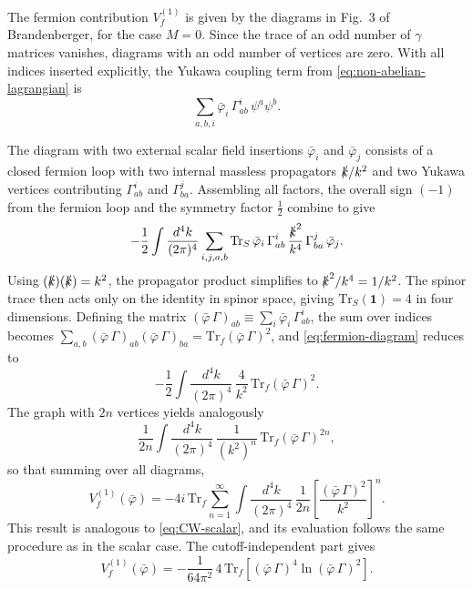 The fermion contribution $V_f^{(1)}$ is given by the diagrams in Fig.~3
of Brandenberger, for the case $M=0$. Since the trace of an odd number
of $\gamma$ matrices vanishes, diagrams with an odd number of vertices
are zero. With all indices inserted explicitly, the Yukawa coupling term
from \eqref{eq:non-abelian-lagrangian} is
\begin{equation}
    \sum_{a,b,i}\bar\varphi_i\,\Gamma^i_{ab}\,\psi^a\psi^b.
    \label{eq:yukawa}
\end{equation}


The diagram with two external scalar field insertions $\bar\varphi_i$
and $\bar\varphi_j$ consists of a closed fermion loop with two internal
massless propagators $\slashed{k}/k^2$ and two Yukawa vertices
contributing $\Gamma^i_{ab}$ and $\Gamma^j_{ba}$. Assembling all
factors, the overall sign $(-1)$ from the fermion loop and the symmetry
factor $\frac{1}{2}$ combine to give
\begin{equation}
    -\frac{1}{2}\int\frac{d^4k}{(2\pi)^4}
    \sum_{i,j,a,b}\mathrm{Tr}_S\,\bar\varphi_i\,\Gamma^i_{ab}\,
    \frac{\slashed{k}^2}{k^4}\,\Gamma^j_{ba}\,\bar\varphi_j.
    \label{eq:fermion-diagram}
\end{equation}
Using $(\slashed{k})(\slashed{k}) = k^2$, the propagator product
simplifies to $\slashed{k}^2/k^4 = 1/k^2$. The spinor trace then acts
only on the identity in spinor space, giving $\mathrm{Tr}_S(\mathbf{1})
= 4$ in four dimensions. Defining the matrix
$(\bar\varphi\,\Gamma)_{ab} \equiv \sum_i\bar\varphi_i\,\Gamma^i_{ab}$,
the sum over indices becomes
$\sum_{a,b}(\bar\varphi\,\Gamma)_{ab}(\bar\varphi\,\Gamma)_{ba}
= \mathrm{Tr}_f(\bar\varphi\,\Gamma)^2$,
and \eqref{eq:fermion-diagram} reduces to
\begin{equation}
    -\frac{1}{2}\int\frac{d^4k}{(2\pi)^4}\,\frac{4}{k^2}\,
    \mathrm{Tr}_f(\bar\varphi\,\Gamma)^2.
\end{equation}
The graph with $2n$ vertices yields analogously
\begin{equation}
    \frac{1}{2n}\int\frac{d^4k}{(2\pi)^4}\,\frac{1}{(k^2)^n}\,
    \mathrm{Tr}_f(\bar\varphi\,\Gamma)^{2n},
\end{equation}
so that summing over all diagrams,
\begin{equation}
    V_f^{(1)}(\bar\varphi) = -4i\,\mathrm{Tr}_f\sum_{n=1}^{\infty}
    \int\frac{d^4k}{(2\pi)^4}\,\frac{1}{2n}
    \left[\frac{(\bar\varphi\,\Gamma)^2}{k^2}\right]^n.
\end{equation}
This result is analogous to \eqref{eq:CW-scalar}, and its evaluation
follows the same procedure as in the scalar case. The cutoff-independent
part gives
\begin{equation}
    V_f^{(1)}(\bar\varphi) = -\frac{1}{64\pi^2}\,4\,
    \mathrm{Tr}_f\!\left[(\bar\varphi\,\Gamma)^4
    \ln(\bar\varphi\,\Gamma)^2\right].
    \label{eq:Vf1}
\end{equation}

